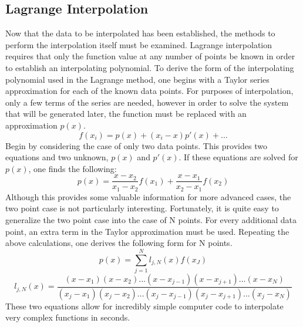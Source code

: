 \documentclass[12pt]{article}
\begin{document}
\subsection{Lagrange Interpolation}
Now that the data to be interpolated has been established, the methods to perform the interpolation itself must be examined.  Lagrange interpolation requires that only the function value at any number of points be known in order to establish an interpolating polynomial.  To derive the form of the interpolating polynomial used in the Lagrange method, one begins with a  Taylor series approximation for each of the known data points.  For purposes of interpolation, only a few terms of the series are needed, however in order to solve the system that will be generated later, the function must be replaced with an approximation $p(x)$.
\begin{equation}
\label{TaylorLagrange}
f(x_i) = p(x) + (x_i-x)p'(x) + ...
\end{equation}
Begin by considering the case of only two data points.  This provides two equations and two unknown, $p(x)$ and $p'(x)$.  If these equations are solved for $p(x)$, one finds the following:
\begin{equation}
\label{P2term}
p(x) = \frac{x-x_2}{x_1-x_2}f(x_1) + \frac{x-x_1}{x_2-x_1}f(x_2)
\end{equation}
Although this provides some valuable information for more advanced cases, the two point case is not particularly interesting.  Fortunately, it is quite easy to generalize the two point case into the case of N points.  For every additional data point, an extra term in the Taylor approximation must be used.  Repeating the above calculations, one derives the following form for N points.
\begin{equation}
\label{PNterm}
p(x) = \sum_{j=1}^N l_{j,N}(x)f(x_J)
\end{equation}
\begin{equation}
\label{LJ}
l_{j,N}(x) = \frac{(x-x_1)(x-x_2)...(x-x_{j-1})(x-x_{j+1})...(x-x_N)}{(x_j-x_1)(x_j-x_2)...(x_j-x_{j-1})(x_j-x_{j+1})...(x_j-x_N)}
\end{equation}
These two equations allow for incredibly simple computer code to interpolate very complex functions in seconds.  
\end{document}
